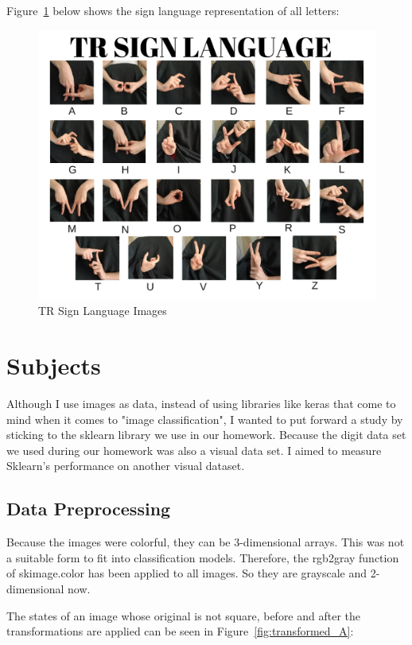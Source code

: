 \documentclass{article}
\begin{document}
\begin{flushleft}
\vspace{2mm}
Figure~\ref{fig:tr_sign_language} below shows the sign language representation of all letters:

\begin{figure}[h]
    \centering
    \includegraphics[scale=0.25]{images/tr sign language.png}
    \caption{TR Sign Language Images}
    \label{fig:tr_sign_language}
\end{figure}
\newpage

\section{Subjects}
\label{subjects}
Although I use images as data, instead of using libraries like keras that come to mind when it comes to "image classification", I wanted to put forward a study by sticking to the sklearn library we use in our homework. Because the digit data set we used during our homework was also a visual data set. I aimed to measure Sklearn's performance on another visual dataset.

\subsection{Data Preprocessing}
Because the images were colorful, they can be 3-dimensional arrays. This was not a suitable form to fit into classification models. Therefore, the rgb2gray function of skimage.color has been applied to all images. So they are grayscale and 2-dimensional now.

\vspace{2mm}
The states of an image whose original is not square, before and after the transformations are applied can be seen in Figure~\ref{fig:transformed_A}:


\end{flushleft}
\end{document}
